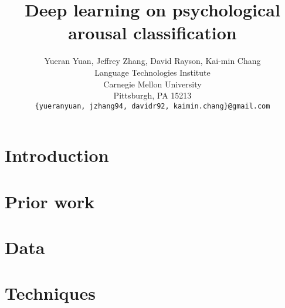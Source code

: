 \documentclass{article} %
\title{
Deep learning on psychological arousal classification}
\author{
Yueran Yuan, Jeffrey Zhang, David Rayson, Kai-min Chang\\
Language Technologies Institute\\
Carnegie Mellon University\\
Pittsburgh, PA 15213\\
\texttt{\{yueranyuan, jzhang94, davidr92, kaimin.chang\}@gmail.com}
}
\begin{document}
\maketitle

\begin{abstract}
\end{abstract}

\section*{Introduction}

\section{Prior work}

\section{Data}

\section{Techniques}
\end{document}
